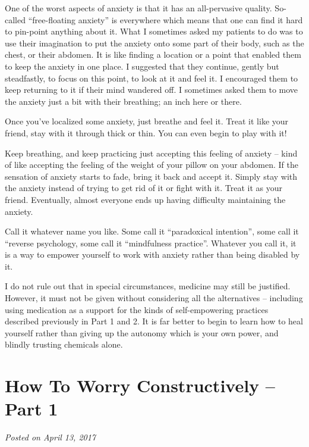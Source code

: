 \documentclass[]{book}
\begin{document}
One of the worst aspects of anxiety is that it has an all-pervasive quality. So-called ``free-floating anxiety'' is everywhere which means that one can find it hard to pin-point anything about it. What I sometimes asked my patients to do was to use their imagination to put the anxiety onto some part of their body, such as the chest, or their abdomen. It is like finding a location or a point that enabled them to keep the anxiety in one place. I suggested that they continue, gently but steadfastly, to focus on this point, to look at it and feel it. I encouraged them to keep returning to it if their mind wandered off. I sometimes asked them to move the anxiety just a bit with their breathing; an inch here or there.

Once you've localized some anxiety, just breathe and feel it. Treat it like your friend, stay with it through thick or thin. You can even begin to play with it!

Keep breathing, and keep practicing just accepting this feeling of anxiety -- kind of like accepting the feeling of the weight of your pillow on your abdomen. If the sensation of anxiety starts to fade, bring it back and accept it. Simply stay with the anxiety instead of trying to get rid of it or fight with it. Treat it as your friend. Eventually, almost everyone ends up having difficulty maintaining the anxiety.

Call it whatever name you like. Some call it ``paradoxical intention'', some call it ``reverse psychology, some call it ``mindfulness practice''. Whatever you call it, it is a way to empower yourself to work with anxiety rather than being disabled by it.

I do not rule out that in special circumstances, medicine may still be justified. However, it must not be given without considering all the alternatives -- including using medication as a support for the kinds of self-empowering practices described previously in Part 1 and 2. It is far better to begin to learn how to heal yourself rather than giving up the autonomy which is your own power, and blindly trusting chemicals alone.

\hypertarget{how-to-worry-constructively-part-1}{%
\section{How To Worry Constructively -- Part 1}\label{how-to-worry-constructively-part-1}}

\emph{Posted on April 13, 2017}
\end{document}
